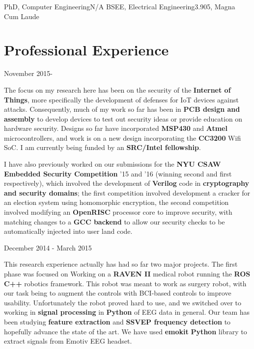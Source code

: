 \documentclass{my_resume}
\begin{document}

    {PhD, Computer Engineering}{N/A}
	{BSEE, Electrical Engineering}{3.905, Magna Cum Laude}

\section{Professional Experience}
    {November 2015-}
\begin{flushleft}
The focus on my research here has been on the security of the \textbf{Internet of Things}, more specifically the development of defenses for IoT devices against attacks.
Consequently, much of my work so far has been in \textbf{PCB design and assembly} to develop devices to test out security ideas or provide education on hardware security. 
Designs so far have incorporated \textbf{MSP430} and \textbf{Atmel} microcontrollers, and work is on a new design incorporating the \textbf{CC3200} Wifi SoC.
I am currently being funded by an \textbf{SRC/Intel fellowship}.

I have also previously worked on our submissions for the \textbf{NYU CSAW Embedded Security Competition} '15 and '16 (winning second and first respectively), which involved the development of \textbf{Verilog} code in
\textbf{cryptography and security domains}; the first competition involved development a cracker for an election system using homomorphic encryption, the second competition involved modifying an \textbf{OpenRISC}
processor core to improve security, with matching changes to a \textbf{GCC backend} to allow our security checks to be automatically injected into user land code.
\end{flushleft}
	{December 2014 - March 2015}
\begin{flushleft}
This research experience actually has had so far two major projects. The first
phase was focused on Working on a \textbf{RAVEN II} medical robot running the
\textbf{ROS C++} robotics framework. This robot was meant to work as surgery
robot, with our task being to augment the controls with BCI-based controls to
improve usability. Unfortunately the robot proved hard to use, and we switched
over to working in \textbf{signal processing} in \textbf{Python} of EEG data in
general. Our team has been studying \textbf{feature extraction} and
\textbf{SSVEP frequency detection} to hopefully advance the state of the art.
We have used \textbf{emokit} \textbf{Python} library to extract signals from
Emotiv EEG headset.
\end{flushleft}
\end{document}
